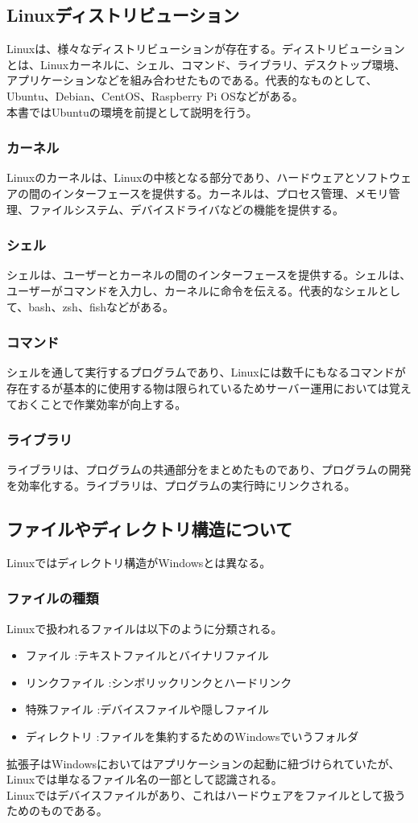 \documentclass[a4paper, 11pt, dvipdfmx]{jsarticle}
\begin{document}
\subsection{Linuxディストリビューション}
Linuxは、様々なディストリビューションが存在する。ディストリビューションとは、Linuxカーネルに、シェル、コマンド、ライブラリ、デスクトップ環境、アプリケーションなどを組み合わせたものである。代表的なものとして、Ubuntu、Debian、CentOS、Raspberry Pi OSなどがある。\\
本書ではUbuntuの環境を前提として説明を行う。
\subsubsection{カーネル}
Linuxのカーネルは、Linuxの中核となる部分であり、ハードウェアとソフトウェアの間のインターフェースを提供する。カーネルは、プロセス管理、メモリ管理、ファイルシステム、デバイスドライバなどの機能を提供する。
\subsubsection{シェル}
シェルは、ユーザーとカーネルの間のインターフェースを提供する。シェルは、ユーザーがコマンドを入力し、カーネルに命令を伝える。代表的なシェルとして、bash、zsh、fishなどがある。
\subsubsection{コマンド}
シェルを通して実行するプログラムであり、Linuxには数千にもなるコマンドが存在するが基本的に使用する物は限られているためサーバー運用においては覚えておくことで作業効率が向上する。
\subsubsection{ライブラリ}
ライブラリは、プログラムの共通部分をまとめたものであり、プログラムの開発を効率化する。ライブラリは、プログラムの実行時にリンクされる。
\subsection{ファイルやディレクトリ構造について}
Linuxではディレクトリ構造がWindowsとは異なる。
\subsubsection{ファイルの種類}
  Linuxで扱われるファイルは以下のように分類される。
  \begin{itemize}
    \item ファイル     :テキストファイルとバイナリファイル
    \item リンクファイル :シンボリックリンクとハードリンク
    \item 特殊ファイル  :デバイスファイルや隠しファイル
    \item ディレクトリ  :ファイルを集約するためのWindowsでいうフォルダ
  \end{itemize}
  拡張子はWindowsにおいてはアプリケーションの起動に紐づけられていたが、Linuxでは単なるファイル名の一部として認識される。\\
  Linuxではデバイスファイルがあり、これはハードウェアをファイルとして扱うためのものである。\\
\end{document}
